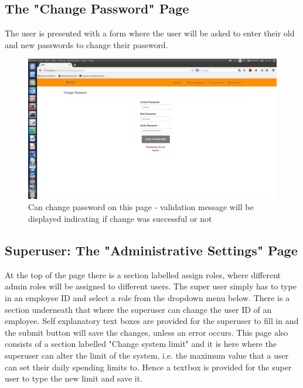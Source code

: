 \documentclass[a4paper,12pt]{article}
\begin{document}
\subsection{The "Change Password" Page} 
The user is presented with a form where the user will be asked to enter their old and new passwords to change their password. 

\begin{figure}[H]
  \centering
    \includegraphics[width=1.0\textwidth]{screenshots/changePassDontMatch.png}
    \caption{Can change password on this page - validation message will be displayed indicating if change was successful or not} 
\end{figure}

\subsection{Superuser: The "Administrative Settings" Page} 
At the top of the page there is a section labelled assign roles, where different admin roles will be assigned to different users. The super user simply has to type in an employee ID and select a role from the dropdown menu below. There is a section underneath that where the superuser can change the user ID of an employee. Self explanatory text boxes are provided for the superuser to fill in and the submit button will save the changes, unless an error occurs.  This page also consists of a section labelled "Change system limit" and it is here where the superuser can alter the limit of the system, i.e. the maximum value that a user can set their daily spending limits to. Hence a textbox is provided for the super user to type the new limit and save it.
\end{document}
